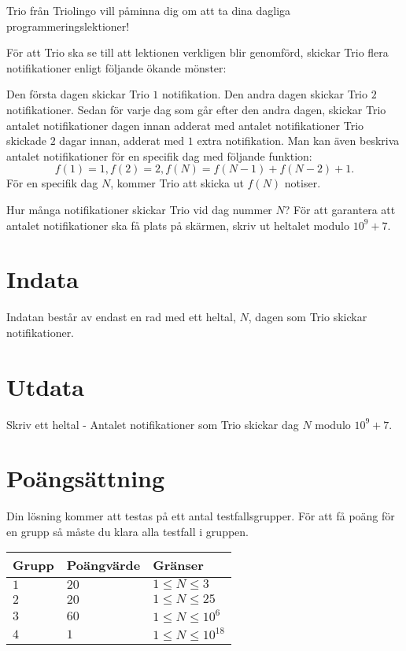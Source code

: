\noindent
Trio från Triolingo vill påminna dig om att ta dina dagliga programmeringslektioner!

\noindent
För att Trio ska se till att lektionen verkligen blir genomförd, skickar Trio flera notifikationer enligt följande ökande mönster:

\noindent
Den första dagen skickar Trio $1$ notifikation.
Den andra dagen skickar Trio $2$ notifikationer.
Sedan för varje dag som går efter den andra dagen, skickar Trio antalet notifikationer dagen innan adderat med antalet notifikationer Trio skickade $2$ dagar innan, adderat med $1$ extra notifikation.
Man kan även beskriva antalet notifikationer för en specifik dag med följande funktion:
$$f(1)=1,f(2)=2,f(N)=f(N-1)+f(N-2)+1.$$ För en specifik dag $N$, kommer Trio att skicka ut $f(N)$ notiser.

\noindent
Hur många notifikationer skickar Trio vid dag nummer $N$? För att garantera att antalet notifikationer ska få plats på skärmen, skriv ut heltalet modulo $10^9+7$.


\section*{Indata}
\noindent
Indatan består av endast en rad med ett heltal, $N$, dagen som Trio skickar notifikationer.

\section*{Utdata}
\noindent
Skriv ett heltal - Antalet notifikationer som Trio skickar dag $N$ modulo $10^9+7$.


\section*{Poängsättning}
\noindent
Din lösning kommer att testas på ett antal testfallsgrupper.
\noindent
För att få poäng för en grupp så måste du klara alla testfall i gruppen.

\noindent
\begin{tabular}{| l | l | l |}
\hline
  Grupp & Poängvärde & Gränser \\ \hline
  $1$    & $20$       &  $1 \leq N \leq 3$ \\ \hline
  $2$    & $20$       &  $1 \leq N \leq 25$ \\ \hline
  $3$    & $60$       &  $1 \leq N \leq 10^6$ \\ \hline
  $4$    & $1$        &  $1 \leq N \leq 10^{18}$ \\ \hline
\end{tabular}
